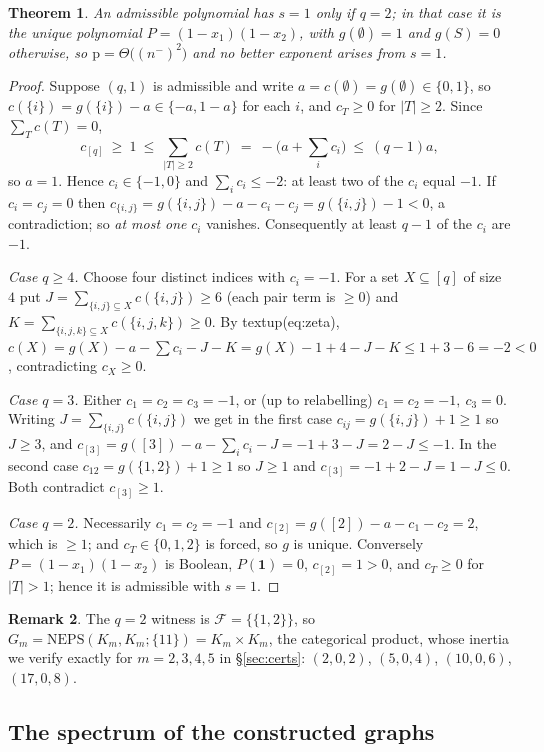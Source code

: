 \documentclass[11pt,a4paper]{article}
\theoremstyle{plain}
\newtheorem{theorem}{Theorem}[section]
\theoremstyle{definition}
\newtheorem{remark}[theorem]{Remark}
\newcommand{\pp}{\mathrm{p}}
\begin{document}
\begin{theorem}
\label{thm:s1}
An admissible polynomial has $s=1$ only if $q=2$; in that case it is the unique
polynomial $P=(1-x_1)(1-x_2)$, with $g(\emptyset)=1$ and $g(S)=0$ otherwise, so
$\pp=\Theta\big((n^-)^{2}\big)$ and no better exponent arises from $s=1$.
\end{theorem}

\begin{proof}
Suppose $(q,1)$ is admissible and write $a=c(\emptyset)=g(\emptyset)\in\{0,1\}$, so
$c(\{i\})=g(\{i\})-a\in\{-a,1-a\}$ for each $i$, and $c_T\ge0$ for $|T|\ge 2$.  Since
$\sum_Tc(T)=0$,
\[
c_{[q]}\ \ge\ 1 \ \le\ \sum_{|T|\ge2}c(T)\ =\ -\Big(a+\sum_i c_i\Big)\ \le\ (q-1)a,
\]
so $a=1$.  Hence $c_i\in\{-1,0\}$ and $\sum_ic_i\le-2$: at least two of the $c_i$ equal
$-1$.  If $c_i=c_j=0$ then $c_{\{i,j\}}=g(\{i,j\})-a-c_i-c_j=g(\{i,j\})-1<0$, a
contradiction; so \emph{at most one} $c_i$ vanishes.  Consequently at least $q-1$ of the
$c_i$ are $-1$.

\emph{Case $q\ge4$.}  Choose four distinct indices with $c_i=-1$.  For a set
$X\subseteq[q]$ of size $4$ put $J=\sum_{\{i,j\}\subseteq X}c(\{i,j\})\ge 6$ (each
pair term is $\ge0$) and $K=\sum_{\{i,j,k\}\subseteq X}c(\{i,j,k\})\ge0$.  By
textup{(eq:zeta)}, $c(X)=g(X)-a-\sum c_i-J-K=g(X)-1+4-J-K\le 1+3-6=-2<0$, contradicting
$c_X\ge0$.

\emph{Case $q=3$.}  Either $c_1=c_2=c_3=-1$, or (up to relabelling)
$c_1=c_2=-1,\ c_3=0$.  Writing $J=\sum_{\{i,j\}}c(\{i,j\})$ we get in the first case
$c_{ij}=g(\{i,j\})+1\ge1$ so $J\ge3$, and
$c_{[3]}=g([3])-a-\sum_i c_i-J=-1+3-J=2-J\le-1$.  In the second case
$c_{12}=g(\{1,2\})+1\ge1$ so $J\ge1$ and $c_{[3]}=-1+2-J=1-J\le0$.  Both contradict
$c_{[3]}\ge1$.

\emph{Case $q=2$.}  Necessarily $c_1=c_2=-1$ and $c_{[2]}=g([2])-a-c_1-c_2=2$, which is
$\ge1$; and $c_T\in\{0,1,2\}$ is forced, so $g$ is unique.  Conversely
$P=(1-x_1)(1-x_2)$ is Boolean, $P(\mathbf 1)=0$, $c_{[2]}=1>0$, and
$c_T\ge0$ for $|T|>1$; hence it is admissible with $s=1$.
\end{proof}

\begin{remark}
The $q=2$ witness is $\mathcal F=\{\{1,2\}\}$, so
$G_m=\mathrm{NEPS}(K_m,K_m;\{11\})=K_m\times K_m$, the categorical product, whose
inertia we verify exactly for $m=2,3,4,5$ in \S\ref{sec:certs}: $(2,0,2)$,
$(5,0,4)$, $(10,0,6)$, $(17,0,8)$.
\end{remark}

\subsection{The spectrum of the constructed graphs}
\label{sec:spectrum}
\end{document}
